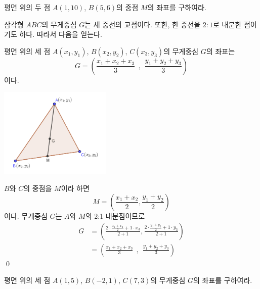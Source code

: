 \documentclass{oblivoir}
\begin{document}
%
\prob{}\label{mid03}
평면 위의 두 점 \(A(1,10)\), \(B(5,6)\)의 중점 \(M\)의 좌표를 구하여라.


삼각형 \(ABC\)의 무게중심 \(G\)는 세 중선의 교점이다.
또한, 한 중선을 \(2:1\)로 내분한 점이기도 하다.
따라서 다음을 얻는다.
%
\begin{mdframed}
\label{mid04}
평면 위의 세 점 \(A(x_1,y_1)\), \(B(x_2,y_2)\), \(C(x_3,y_3)\)의 무게중심 \(G\)의 좌표는
\[G=\left(\frac{x_1+x_2+x_3}3\:\:,\:\:\frac{y_1+y_2+y_3}3\right)\]
이다.
\end{mdframed}

\begin{center}
\includegraphics[width=0.4\textwidth]{mid_04}
\end{center}

%
\proo
\(B\)와 \(C\)의 중점을 \(M\)이라 하면
\[M=\left(\frac{x_1+x_2}2,\frac{y_1+y_2}2\right)\]
이다.
무게중심 \(G\)는 \(A\)와 \(M\)의 2:1 내분점이므로
\begin{align*}
G
&=\left(\frac{2\cdot\frac{x_1+x_2}2+1\cdot x_3}{2+1},
\frac{2\cdot\frac{y_1+y_2}2+1\cdot y_3}{2+1}\right)\\
&=\left(\frac{x_1+x_2+x_3}3\:\:,\:\:\frac{y_1+y_2+y_3}3\right)
\end{align*}
\qed

\clearpage
%
\prob{}\label{mid05}
평면 위의 세 점 \(A(1,5)\), \(B(-2,1)\), \(C(7,3)\)의 무게중심 \(G\)의 좌표를 구하여라.
\end{document}
